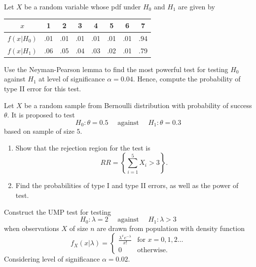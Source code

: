 \begin{mdframed}
    \begin{Exercise}
        Let $X$ be a random variable whose pdf under $H_0$ and $H_1$ are given by
        \begin{center}
            \begin{tabular}{c|ccccccc}
                $x$ & 1 & 2 & 3 & 4 & 5 & 6 & 7\\
                \hline
                $f(x|H_0)$ & .01 & .01 & .01 & .01 & .01 & .01 & .94\\
                $f(x|H_1)$ & .06 & .05 & .04 & .03 & .02 & .01 & .79\\
            \end{tabular}
        \end{center}
        Use the Neyman-Pearson lemma to find the most powerful test for testing $H_0$ against $H_1$ at level of significance
        $\alpha = 0.04$. Hence, compute the probability of type II error for this test.
    \end{Exercise}

    \begin{Exercise}
        Let $X$ be a random sample from Bernoulli distribution 
        with probability of success $\theta$. It is proposed to test
        \[
            H_0 : \theta = 0.5 \quad \text{ against } \quad H_1 : \theta = 0.3
        \]
        based on sample of size $5$.
        \begin{enumerate}
            \item Show that the rejection region for the test is 
            \[
                RR = \left\{ \sum_{i=1}^{5} X_i > 3 \right\}.
            \]
            \item Find the probabilities of type I and type II errors, as well as the power of test.
        \end{enumerate}
    \end{Exercise}

    \begin{Exercise}
        Construct the UMP test for testing 
        \[
            H_0 : \lambda = 2 \quad \text{ against } \quad H_1 : \lambda > 3
        \]
        when observations $X$ of size $n$ are drawn from population with density function
        \[
            f_X(x|\lambda) = \begin{cases}
                \displaystyle \frac{\lambda^x e^{-\lambda}}{x!} & \text{for } x = 0,1,2\ldots \\
                0 & \text{otherwise}.
            \end{cases}
        \]
        Considering level of significance $\alpha = 0.02$.
    \end{Exercise}


\end{mdframed}
